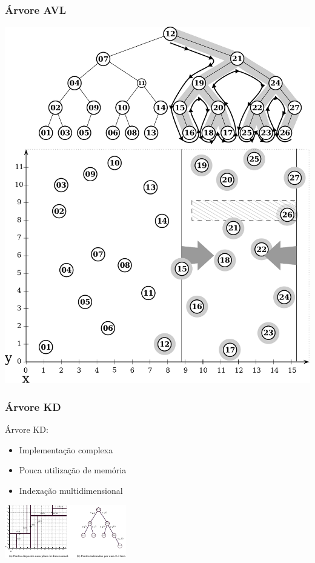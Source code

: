 \documentclass[10pt,xcolor=table,fleqn]{beamer}
\newcommand{\badpt}{{\color{defred} \DOWNarrow }}
\newcommand{\goodpt}{{\color{defgreen} \UParrow }}
\begin{document}
\begin{frame}
  \frametitle{Árvore AVL}
  \begin{center}
    \includegraphics[scale=0.3]{../img/points-query/avl/points-avl-query}
  \end{center}
\end{frame}


\begin{frame}
  \frametitle{Árvore KD}
  Árvore KD:\\
  \begin{itemize}
    \item{ Implementação complexa \badpt }
    \item{ Pouca utilização de memória \goodpt }
    \item{ Indexação multidimensional \goodpt }
  \end{itemize}
  \pause
  \begin{center}
    \includegraphics[scale=3.0]{../img/kdt/dom-kd}
  \end{center}
\end{frame}
\end{document}
